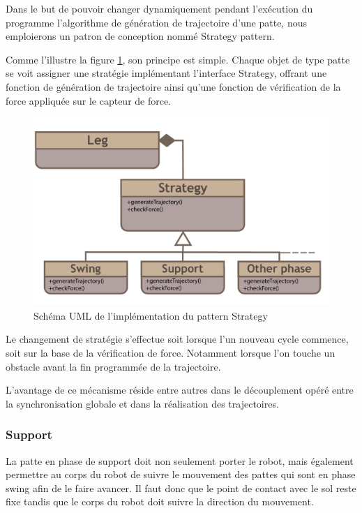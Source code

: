 \documentclass{tnreport}
\begin{document}
Dans le but de pouvoir changer dynamiquement pendant l'exécution du programme l'algorithme de génération de trajectoire d'une patte, nous emploierons un patron de conception nommé Strategy pattern.

Comme l'illustre la figure \ref{fig:strategy}, son principe est simple. Chaque objet de type patte se voit assigner une stratégie implémentant l'interface Strategy, offrant une fonction de génération de trajectoire ainsi qu'une fonction de vérification de la force appliquée sur le capteur de force. 

\begin{figure}[h]
    \centering
    \includegraphics[width = 14cm]{figures/strategy}
    \caption{Schéma UML de l'implémentation du pattern Strategy}
    \label{fig:strategy}
    
\end{figure}
Le changement de stratégie s'effectue soit lorsque l'un nouveau cycle commence, soit sur la base de la vérification de force. Notamment lorsque l'on touche un obstacle avant la fin programmée de la trajectoire. 

L'avantage de ce mécanisme réside entre autres dans le découplement opéré entre la synchronisation globale et dans la réalisation des trajectoires. 

\subsubsection{Support}
La patte en phase de support doit non seulement porter le robot, mais également permettre au corps du robot de suivre le mouvement des pattes qui sont en  phase swing afin de le faire avancer. Il faut donc que le point de contact avec le sol reste fixe tandis que le corps du robot doit suivre la direction du mouvement. 
\end{document}
